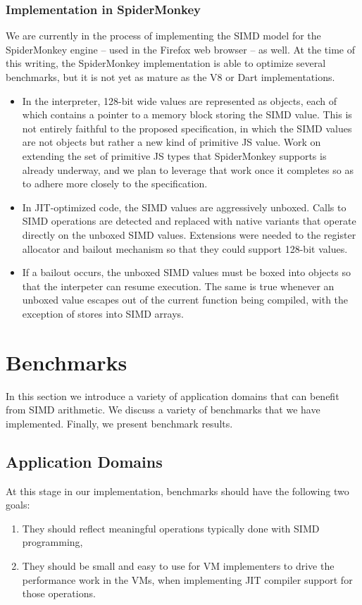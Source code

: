 \documentclass{sigplanconf}
\begin{document}
\subsubsection{Implementation in SpiderMonkey}

We are currently in the process of implementing the SIMD model for the
SpiderMonkey engine -- used in the Firefox web browser -- as well. At
the time of this writing, the SpiderMonkey implementation is able to
optimize several benchmarks, but it is not yet as mature as the V8 or
Dart implementations.

\begin{itemize}
\item
In the interpreter, 128-bit wide values are represented as objects,
each of which contains a pointer to a memory block storing the SIMD
value. This is not entirely faithful to the proposed specification, in
which the SIMD values are not objects but rather a new kind of
primitive JS value. Work on extending the set of primitive JS types
that SpiderMonkey supports is already underway, and we plan to
leverage that work once it completes so as to adhere more closely to
the specification.

\item
In JIT-optimized code, the SIMD values are aggressively unboxed. Calls
to SIMD operations are detected and replaced with native variants that
operate directly on the unboxed SIMD values. Extensions were needed to
the register allocator and bailout mechanism so that they could
support 128-bit values.

\item
If a bailout occurs, the unboxed SIMD values must be boxed into
objects so that the interpeter can resume execution. The same is true
whenever an unboxed value escapes out of the current function being
compiled, with the exception of stores into SIMD arrays.

\end{itemize}

\section{Benchmarks}
\label{sec:benchmarks}

In this section we introduce a variety of application domains that can benefit
from SIMD arithmetic. We discuss a variety of benchmarks that we have
implemented. Finally, we present benchmark results.

\subsection{Application Domains}
%
At this stage in our implementation, benchmarks should have the
following two goals:
%
\begin{enumerate}
\item
They should reflect meaningful operations typically done with SIMD programming,
\item
They should be small and easy to use for VM implementers to drive the
performance work in the VMs, when implementing JIT compiler support for those
operations.
\end{enumerate}
\end{document}
